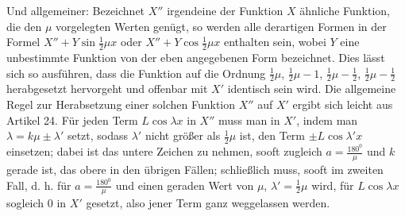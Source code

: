 Und allgemeiner: Bezeichnet $X''$ irgendeine der Funktion $X$ ähnliche Funktion, die den $\mu$ vorgelegten Werten genügt, so werden alle derartigen Formen in der Formel $X''+Y\sin\frac12\mu x$ oder $X''+Y\cos\frac12\mu x$ enthalten sein, wobei $Y$ eine unbestimmte Funktion von der eben angegebenen Form bezeichnet. Dies lässt sich so ausführen, dass die Funktion auf die Ordnung $\frac12\mu$, $\frac12\mu-1$, $\frac12\mu-\frac12$, $\frac12\mu-\frac12$ herabgesetzt hervorgeht und offenbar mit $X'$ identisch sein wird. Die allgemeine Regel zur Herabsetzung einer solchen Funktion $X''$ auf $X'$ ergibt sich leicht aus Artikel 24. Für jeden Term $L\cos\lambda x$ in $X''$ muss man in $X'$, indem man $\lambda=k\mu\pm\lambda'$ setzt, sodass $\lambda'$ nicht größer als $\frac12\mu$ ist, den Term $\pm L\cos\lambda'x$ einsetzen; dabei ist das untere Zeichen zu nehmen, sooft zugleich $a=\frac{180^{{\mathord{0}}}}{\mu}$ und $k$ gerade ist, das obere in den übrigen Fällen; schließlich muss, sooft im zweiten Fall, d. h. für $a=\frac{180^{{\mathord{0}}}}{\mu}$ und einen geraden Wert von $\mu$, $\lambda'=\frac12\mu$ wird, für $L\cos\lambda x$ sogleich $0$ in $X'$ gesetzt, also jener Term ganz weggelassen werden.

\endgroup
